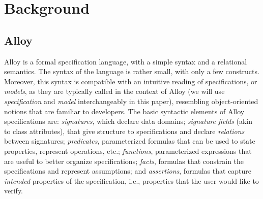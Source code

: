 \section{Background}

\subsection{Alloy}

Alloy is a formal specification language, with a simple syntax and a relational semantics. The syntax of the language is rather small, with only a few constructs. Moreover, this syntax is compatible with an intuitive reading of specifications, or \emph{models}, as they are typically called in the context of Alloy \cite{Jackson2006} (we will use \emph{specification} and \emph{model} interchangeably in this paper), resembling object-oriented notions that are familiar to developers. The basic syntactic elements of Alloy specifications are: \emph{signatures}, which declare data domains; \emph{signature fields} (akin to class attributes), that give structure to specifications and declare \emph{relations} between signatures; \emph{predicates}, parameterized formulas that can be used to state properties, represent operations, etc.; \emph{functions}, parameterized expressions that are useful to better organize specifications; \emph{facts}, formulas that constrain the specifications and represent assumptions; and \emph{assertions}, formulas that capture \emph{intended} properties of the specification, i.e., properties that the user would like to verify. 

